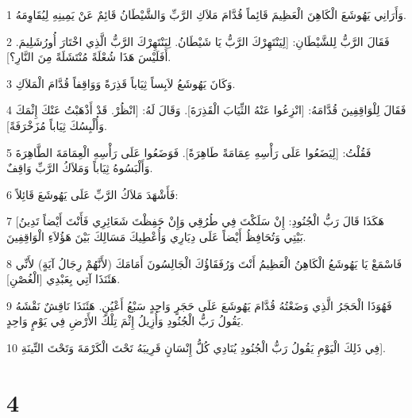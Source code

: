 \par 1 وَأَرَانِي يَهُوشَعَ الْكَاهِنَ الْعَظِيمَ قَائِماً قُدَّامَ مَلاَكِ الرَّبِّ وَالشَّيْطَانُ قَائِمٌ عَنْ يَمِينِهِ لِيُقَاوِمَهُ.
\par 2 فَقَالَ الرَّبُّ لِلشَّيْطَانِ: [لِيَنْتَهِرْكَ الرَّبُّ يَا شَيْطَانُ. لِيَنْتَهِرْكَ الرَّبُّ الَّذِي اخْتَارَ أُورُشَلِيمَ. أَفَلَيْسَ هَذَا شُعْلَةً مُنْتَشَلَةً مِنَ النَّارِ؟].
\par 3 وَكَانَ يَهُوشَعُ لاَبِساً ثِيَاباً قَذِرَةً وَوَاقِفاً قُدَّامَ الْمَلاَكِ.
\par 4 فَقَالَ لِلْوَاقِفِينَ قُدَّامَهُ: [انْزِعُوا عَنْهُ الثِّيَابَ الْقَذِرَةَ]. وَقَالَ لَهُ: [انْظُرْ. قَدْ أَذْهَبْتُ عَنْكَ إِثْمَكَ وَأُلْبِسُكَ ثِيَاباً مُزَخْرَفَةً].
\par 5 فَقُلْتُ: [لِيَضَعُوا عَلَى رَأْسِهِ عِمَامَةً طَاهِرَةً]. فَوَضَعُوا عَلَى رَأْسِهِ الْعِمَامَةَ الطَّاهِرَةَ وَأَلْبَسُوهُ ثِيَاباً وَمَلاَكُ الرَّبِّ وَاقِفٌ.
\par 6 فَأَشْهَدَ مَلاَكُ الرَّبِّ عَلَى يَهُوشَعَ قَائِلاً:
\par 7 [هَكَذَا قَالَ رَبُّ الْجُنُودِ: إِنْ سَلَكْتَ فِي طُرُقِي وَإِنْ حَفِظْتَ شَعَائِرِي فَأَنْتَ أَيْضاً تَدِينُ بَيْتِي وَتُحَافِظُ أَيْضاً عَلَى دِيَارِي وَأُعْطِيكَ مَسَالِكَ بَيْنَ هَؤُلاَءِ الْوَاقِفِينَ.
\par 8 فَاسْمَعْ يَا يَهُوشَعُ الْكَاهِنُ الْعَظِيمُ أَنْتَ وَرُفَقَاؤُكَ الْجَالِسُونَ أَمَامَكَ (لأَنَّهُمْ رِجَالُ آيَةٍ) لأَنِّي هَئَنَذَا آتِي بِعَبْدِي [الْغُصْنِ].
\par 9 فَهُوَذَا الْحَجَرُ الَّذِي وَضَعْتُهُ قُدَّامَ يَهُوشَعَ عَلَى حَجَرٍ وَاحِدٍ سَبْعُ أَعْيُنٍ. هَئَنَذَا نَاقِشٌ نَقْشَهُ يَقُولُ رَبُّ الْجُنُودِ وَأُزِيلُ إِثْمَ تِلْكَ الأَرْضِ فِي يَوْمٍ وَاحِدٍ.
\par 10 فِي ذَلِكَ الْيَوْمِ يَقُولُ رَبُّ الْجُنُودِ يُنَادِي كُلُّ إِنْسَانٍ قَرِيبَهُ تَحْتَ الْكَرْمَةَ وَتَحْتَ التِّينَةِ].

\chapter{4}

